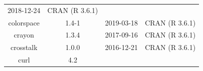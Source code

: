 \documentclass[11pt,]{book}
\begin{document}
\begin{longtable}[]{@{}cccc@{}}
\begin{minipage}[t]{0.16\columnwidth}
2018-12-24\strut
\end{minipage} & \begin{minipage}[t]{0.36\columnwidth}\centering\strut
CRAN (R 3.6.1)\strut
\end{minipage}\tabularnewline
\begin{minipage}[t]{0.18\columnwidth}\centering\strut
colorspace\strut
\end{minipage} & \begin{minipage}[t]{0.19\columnwidth}\centering\strut
1.4-1\strut
\end{minipage} & \begin{minipage}[t]{0.16\columnwidth}\centering\strut
2019-03-18\strut
\end{minipage} & \begin{minipage}[t]{0.36\columnwidth}\centering\strut
CRAN (R 3.6.1)\strut
\end{minipage}\tabularnewline
\begin{minipage}[t]{0.18\columnwidth}\centering\strut
crayon\strut
\end{minipage} & \begin{minipage}[t]{0.19\columnwidth}\centering\strut
1.3.4\strut
\end{minipage} & \begin{minipage}[t]{0.16\columnwidth}\centering\strut
2017-09-16\strut
\end{minipage} & \begin{minipage}[t]{0.36\columnwidth}\centering\strut
CRAN (R 3.6.1)\strut
\end{minipage}\tabularnewline
\begin{minipage}[t]{0.18\columnwidth}\centering\strut
crosstalk\strut
\end{minipage} & \begin{minipage}[t]{0.19\columnwidth}\centering\strut
1.0.0\strut
\end{minipage} & \begin{minipage}[t]{0.16\columnwidth}\centering\strut
2016-12-21\strut
\end{minipage} & \begin{minipage}[t]{0.36\columnwidth}\centering\strut
CRAN (R 3.6.1)\strut
\end{minipage}\tabularnewline
\begin{minipage}[t]{0.18\columnwidth}\centering\strut
curl\strut
\end{minipage} & \begin{minipage}[t]{0.19\columnwidth}\centering\strut
4.2\strut
\end{minipage} & \begin{minipage}[t]{0.16\columnwidth}\centering\strut

\end{minipage}
\end{longtable}
\end{document}
